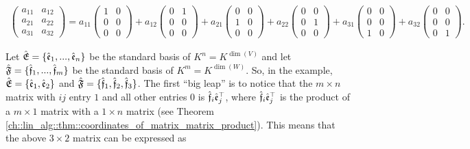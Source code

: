 \begin{align*}
    \begin{pmatrix}
        a_{11} & a_{12} \\
        a_{21} & a_{22} \\
        a_{31} & a_{32}
    \end{pmatrix}
    =
    a_{11}
    \begin{pmatrix}
        1 & 0 \\
        0 & 0 \\
        0 & 0
    \end{pmatrix}
    +
    a_{12}
    \begin{pmatrix}
        0 & 1 \\
        0 & 0 \\
        0 & 0
    \end{pmatrix}
    +
    a_{21}
    \begin{pmatrix}
        0 & 0 \\
        1 & 0 \\
        0 & 0
    \end{pmatrix}
    +
    a_{22}
    \begin{pmatrix}
        0 & 0 \\
        0 & 1 \\
        0 & 0
    \end{pmatrix}
    +
    a_{31}
    \begin{pmatrix}
        0 & 0 \\
        0 & 0 \\
        1 & 0
    \end{pmatrix}
    +
    a_{32}
    \begin{pmatrix}
        0 & 0 \\
        0 & 0 \\
        0 & 1
    \end{pmatrix}.
\end{align*}

Let ${\hat{\mathfrak{E}}} = \{\hat{\mathfrak{e}}_1, ..., \hat{\mathfrak{e}}_n\}$ be the standard basis of $K^n = K^{\dim(V)}$ and let ${\hat{\mathfrak{F}}} = \{\hat{\mathfrak{f}}_1, ..., \hat{\mathfrak{f}}_m\}$ be the standard basis of $K^m = K^{\dim(W)}$. So, in the example, ${\hat{\mathfrak{E}}} = \{\hat{\mathfrak{e}}_1, \hat{\mathfrak{e}}_2\}$ and ${\hat{\mathfrak{F}}} = \{\hat{\mathfrak{f}}_1, \hat{\mathfrak{f}}_2, \hat{\mathfrak{f}}_3\}$. The first ``big leap'' is to notice that the $m \times n$ matrix with $ij$ entry $1$ and all other entries 0 is $\hat{\mathfrak{f}}_i \hat{\mathfrak{e}}_j^\top$, where $\hat{\mathfrak{f}}_i \hat{\mathfrak{e}}_j^\top$ is the product of a $m \times 1$ matrix with a $1 \times n$ matrix (see Theorem \ref{ch::lin_alg::thm::coordinates_of_matrix_matrix_product}). This means that the above $3 \times 2$ matrix can be expressed as

